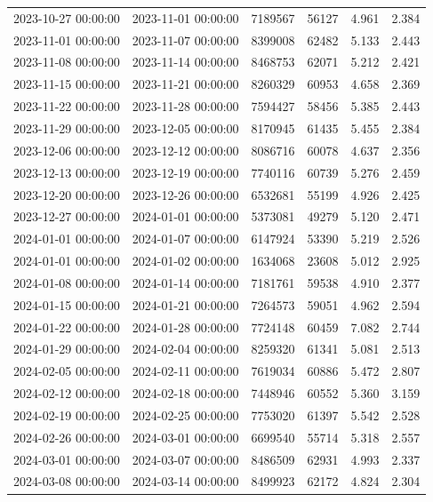 \begin{tabular}{llrrrr}
2023-10-27 00:00:00 & 2023-11-01 00:00:00 & 7189567 & 56127 & 4.961 & 2.384 \\
2023-11-01 00:00:00 & 2023-11-07 00:00:00 & 8399008 & 62482 & 5.133 & 2.443 \\
2023-11-08 00:00:00 & 2023-11-14 00:00:00 & 8468753 & 62071 & 5.212 & 2.421 \\
2023-11-15 00:00:00 & 2023-11-21 00:00:00 & 8260329 & 60953 & 4.658 & 2.369 \\
2023-11-22 00:00:00 & 2023-11-28 00:00:00 & 7594427 & 58456 & 5.385 & 2.443 \\
2023-11-29 00:00:00 & 2023-12-05 00:00:00 & 8170945 & 61435 & 5.455 & 2.384 \\
2023-12-06 00:00:00 & 2023-12-12 00:00:00 & 8086716 & 60078 & 4.637 & 2.356 \\
2023-12-13 00:00:00 & 2023-12-19 00:00:00 & 7740116 & 60739 & 5.276 & 2.459 \\
2023-12-20 00:00:00 & 2023-12-26 00:00:00 & 6532681 & 55199 & 4.926 & 2.425 \\
2023-12-27 00:00:00 & 2024-01-01 00:00:00 & 5373081 & 49279 & 5.120 & 2.471 \\
2024-01-01 00:00:00 & 2024-01-07 00:00:00 & 6147924 & 53390 & 5.219 & 2.526 \\
2024-01-01 00:00:00 & 2024-01-02 00:00:00 & 1634068 & 23608 & 5.012 & 2.925 \\
2024-01-08 00:00:00 & 2024-01-14 00:00:00 & 7181761 & 59538 & 4.910 & 2.377 \\
2024-01-15 00:00:00 & 2024-01-21 00:00:00 & 7264573 & 59051 & 4.962 & 2.594 \\
2024-01-22 00:00:00 & 2024-01-28 00:00:00 & 7724148 & 60459 & 7.082 & 2.744 \\
2024-01-29 00:00:00 & 2024-02-04 00:00:00 & 8259320 & 61341 & 5.081 & 2.513 \\
2024-02-05 00:00:00 & 2024-02-11 00:00:00 & 7619034 & 60886 & 5.472 & 2.807 \\
2024-02-12 00:00:00 & 2024-02-18 00:00:00 & 7448946 & 60552 & 5.360 & 3.159 \\
2024-02-19 00:00:00 & 2024-02-25 00:00:00 & 7753020 & 61397 & 5.542 & 2.528 \\
2024-02-26 00:00:00 & 2024-03-01 00:00:00 & 6699540 & 55714 & 5.318 & 2.557 \\
2024-03-01 00:00:00 & 2024-03-07 00:00:00 & 8486509 & 62931 & 4.993 & 2.337 \\
2024-03-08 00:00:00 & 2024-03-14 00:00:00 & 8499923 & 62172 & 4.824 & 2.304 \\

\end{tabular}
